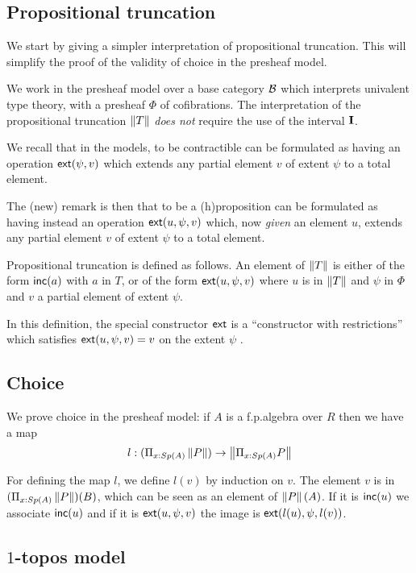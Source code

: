 \subsection{Propositional truncation}

    We start by giving a simpler interpretation of propositional truncation. This will simplify
    the proof of the validity of choice in the presheaf model.

    We work in the presheaf model over a base category $\mathcal{B}$ which interprets univalent type theory,
    with a presheaf $\Phi$ of cofibrations. The interpretation of the propositional
    truncation $\left\lVert T \right\rVert$ {\em does not} require the use of the interval $\mathbf{I}$.

    We recall that in the models, to be contractible can be formulated as having an operation
    $\mathsf{ext}(\psi,v)$ which extends any partial element $v$ of extent $\psi$ to a total element.

    The (new) remark is then that to be a (h)proposition can be formulated as having instead
    an operation $\mathsf{ext}(u,\psi,v)$ which, now {\em given}
    an element $u$, extends any partial element $v$ of extent $\psi$ to a total element.

\medskip    

Propositional truncation is defined as follows. An element of $\left\lVert T \right\rVert$ is either of the form
$\mathsf{inc}(a)$ with $a$ in $T$, or of the form $\mathsf{ext}(u,\psi,v)$ where $u$ is in $\left\lVert T \right\rVert$ and $\psi$
in $\Phi$ and $v$ a partial element of extent $\psi$.

In this definition, the special constructor $\mathsf{ext}$ is a ``constructor with restrictions'' which
satisfies $\mathsf{ext}(u,\psi,v) = v$ on the extent $\psi$ \cite{CoquandHM18}.

\subsection{Choice}

We prove choice in the presheaf model: if $A$ is a f.p.\@ algebra over $R$ then we have a map
$$
l:(\Pi_{x:Sp(A)}\left\lVert P \right\rVert)\rightarrow \left\lVert \Pi_{x:Sp(A)}P \right\rVert
$$

For defining the map $l$, we define $l(v)$ by induction on $v$.
The element $v$ is in $(\Pi_{x:Sp(A)}\left\lVert P \right\rVert)(B)$, which can be seen as
an element of $\left\lVert P \right\rVert(A)$. If it is $\mathsf{inc}(u)$ we associate $\mathsf{inc}(u)$ and 
if it is $\mathsf{ext}(u,\psi,v)$ the image is $\mathsf{ext}(l(u),\psi,l(v))$.

\subsection{$1$-topos model}

